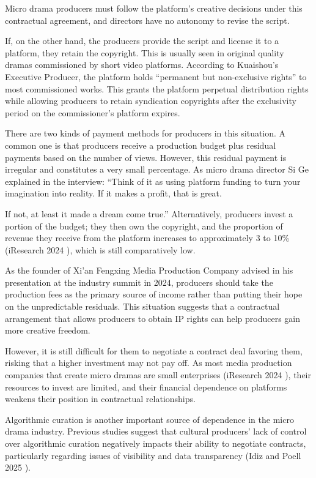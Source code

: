 \documentclass[10pt,a4paper]{article}
\begin{document}
Micro drama producers must follow the platform’s creative decisions under this contractual agreement, and directors have no autonomy to revise the script.\par
If, on the other hand, the producers provide the script and license it to a platform, they retain the copyright. This is usually seen in original quality dramas commissioned by short video platforms. According to Kuaishou’s Executive Producer, the platform holds “permanent but non-exclusive rights” to most commissioned works. This grants the platform perpetual distribution rights while allowing producers to retain syndication copyrights after the exclusivity period on the commissioner’s platform expires.\par
There are two kinds of payment methods for producers in this situation. A common one is that producers receive a production budget plus residual payments based on the number of views. However, this residual payment is irregular and constitutes a very small percentage. As micro drama director Si Ge explained in the interview: “Think of it as using platform funding to turn your imagination into reality. If it makes a profit, that is great.\par
If not, at least it made a dream come true.” Alternatively, producers invest a portion of the budget; they then own the copyright, and the proportion of revenue they receive from the platform increases to approximately 3 to 10\% (iResearch 2024 ), which is still comparatively low.\par
As the founder of Xi’an Fengxing Media Production Company advised in his presentation at the industry summit in 2024, producers should take the production fees as the primary source of income rather than putting their hope on the unpredictable residuals. This situation suggests that a contractual arrangement that allows producers to obtain IP rights can help producers gain more creative freedom.\par
However, it is still difficult for them to negotiate a contract deal favoring them, risking that a higher investment may not pay off. As most media production companies that create micro dramas are small enterprises (iResearch 2024 ), their resources to invest are limited, and their financial dependence on platforms weakens their position in contractual relationships.\par
Algorithmic curation is another important source of dependence in the micro drama industry. Previous studies suggest that cultural producers’ lack of control over algorithmic curation negatively impacts their ability to negotiate contracts, particularly regarding issues of visibility and data transparency (Idiz and Poell 2025 ).\par
\end{document}
